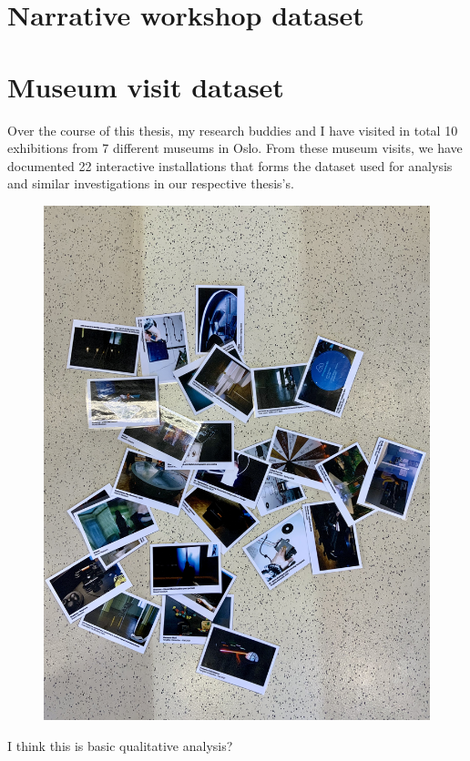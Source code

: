 
\section{Narrative workshop dataset}



\section{Museum visit dataset}

Over the course of this thesis, my research buddies and I have visited in total 10 exhibitions from 7 different museums in Oslo. From these museum visits, we have documented 22 interactive installations that forms the dataset used for analysis and similar investigations in our respective thesis's. 

\begin{figure}[H]
\includegraphics[width=12cm]{pictures/dataset/datasett_oversikt.jpeg}
\centering 
\end{figure}

I think this is basic qualitative analysis?

